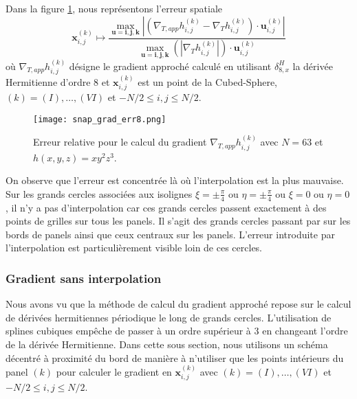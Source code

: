 Dans la figure \ref{fig:err_grad}, nous représentons l'erreur spatiale
\begin{equation}
\mathbf{x}_{i,j}^{(k)} \mapsto \dfrac{\max_{\mathbf{u}=\mathbf{i}, \mathbf{j}, \mathbf{k}} | \left( \nabla_{T,app} h_{i,j}^{(k)} - \nabla_T h_{i,j}^{(k)} \right)\cdot \mathbf{u}_{i,j}^{(k)} | }{\max_{\mathbf{u}=\mathbf{i}, \mathbf{j}, \mathbf{k}} \left(  | \nabla_T h_{i,j}^{(k)} |\right)\cdot \mathbf{u}_{i,j}^{(k)}}
\end{equation}
où $\nabla_{T,app} h_{i,j}^{(k)}$ désigne le gradient approché calculé en utilisant $\delta_{8,x}^H$ la dérivée Hermitienne d'ordre 8 et $\mathbf{x}_{i,j}^{(k)}$ est un point de la Cubed-Sphere, $(k)= (I), \ldots , (VI)$ et $-N/2 \leq i,j \leq N/2$.
\begin{figure}[htbp]
\begin{center}
\texttt{[image: snap\_grad\_err8.png]}
\end{center}
\caption{Erreur relative pour le calcul du gradient $\nabla_{T,app} h_{i,j}^{(k)}$ avec $N=63$ et $h(x,y,z)=x y^2 z^3$. }
\label{fig:err_grad}
\end{figure}
On observe que l'erreur est concentrée là où l'interpolation est la plus mauvaise. Sur les grands cercles associées aux isolignes $\xi = \pm \frac{\pi}{4}$ ou $\eta = \pm \frac{\pi}{4}$ ou $\xi = 0$ ou $\eta = 0$, il n'y a pas d'interpolation car ces grands cercles passent exactement à des points de grilles sur tous les panels. Il s'agit des grands cercles passant par sur les bords de panels ainsi que ceux centraux sur les panels. L'erreur introduite par l'interpolation est particulièrement visible loin de ces cercles.













\subsubsection{Gradient sans interpolation}

Nous avons vu que la méthode de calcul du gradient approché repose sur le calcul de dérivées hermitiennes périodique le long de grands cercles. L'utilisation de splines cubiques empêche de passer à un ordre supérieur à 3 en changeant l'ordre de la dérivée Hermitienne. Dans cette sous section, nous utilisons un schéma décentré à proximité du bord de manière à n'utiliser que les points intérieurs du panel $(k)$ pour calculer le gradient en $\mathbf{x}_{i,j}^{(k)}$ avec $(k) = (I), \ldots ,(VI)$ et $-N/2 \leq i,j \leq N/2$.

